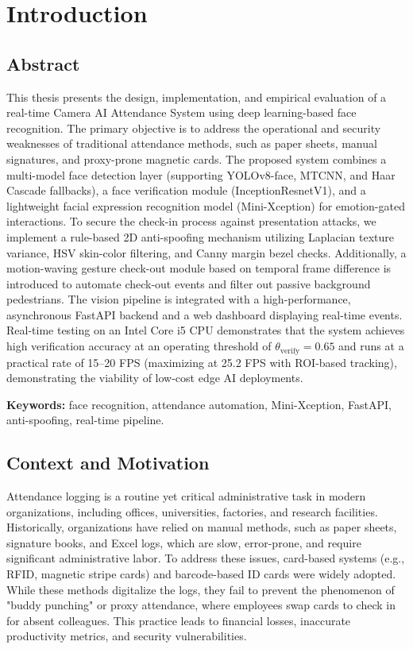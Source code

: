 \chapter{Introduction}

\section{Abstract}
This thesis presents the design, implementation, and empirical evaluation of a real-time Camera AI Attendance System using deep learning-based face recognition. The primary objective is to address the operational and security weaknesses of traditional attendance methods, such as paper sheets, manual signatures, and proxy-prone magnetic cards. The proposed system combines a multi-model face detection layer (supporting YOLOv8-face, MTCNN, and Haar Cascade fallbacks), a face verification module (InceptionResnetV1), and a lightweight facial expression recognition model (Mini-Xception) for emotion-gated interactions. To secure the check-in process against presentation attacks, we implement a rule-based 2D anti-spoofing mechanism utilizing Laplacian texture variance, HSV skin-color filtering, and Canny margin bezel checks. Additionally, a motion-waving gesture check-out module based on temporal frame difference is introduced to automate check-out events and filter out passive background pedestrians. The vision pipeline is integrated with a high-performance, asynchronous FastAPI backend and a web dashboard displaying real-time events. Real-time testing on an Intel Core i5 CPU demonstrates that the system achieves high verification accuracy at an operating threshold of $\theta_{\text{verify}} = 0.65$ and runs at a practical rate of 15--20 FPS (maximizing at 25.2 FPS with ROI-based tracking), demonstrating the viability of low-cost edge AI deployments.

\noindent\textbf{Keywords:} face recognition, attendance automation, Mini-Xception, FastAPI, anti-spoofing, real-time pipeline.

\section{Context and Motivation}
Attendance logging is a routine yet critical administrative task in modern organizations, including offices, universities, factories, and research facilities. Historically, organizations have relied on manual methods, such as paper sheets, signature books, and Excel logs, which are slow, error-prone, and require significant administrative labor. To address these issues, card-based systems (e.g., RFID, magnetic stripe cards) and barcode-based ID cards were widely adopted. While these methods digitalize the logs, they fail to prevent the phenomenon of "buddy punching" or proxy attendance, where employees swap cards to check in for absent colleagues. This practice leads to financial losses, inaccurate productivity metrics, and security vulnerabilities.

